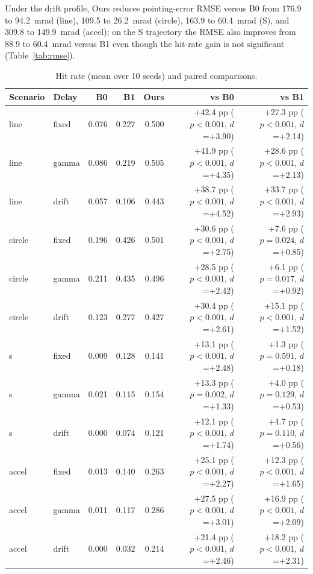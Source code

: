 \documentclass[journal]{IEEEtran}
\begin{document}
Under the drift profile, Ours reduces pointing-error RMSE versus B0 from 176.9 to 94.2~mrad (line), 109.5 to 26.2~mrad (circle), 163.9 to 60.4~mrad (S), and 309.8 to 149.9~mrad (accel); on the S trajectory the RMSE also improves from 88.9 to 60.4~mrad versus B1 even though the hit-rate gain is not significant (Table~\ref{tab:rmse}).

\begin{table}[t]\centering\small

\caption{Hit rate (mean over 10 seeds) and paired comparisons.}

\label{tab:primary}

\begin{tabular}{llrrrrr}

\toprule Scenario & Delay & B0 & B1 & Ours & vs B0 & vs B1\\ \midrule

line & fixed & 0.076 & 0.227 & 0.500 & +42.4 pp ($p<0.001$, $d$=+3.90) & +27.3 pp ($p<0.001$, $d$=+2.14)\\

line & gamma & 0.086 & 0.219 & 0.505 & +41.9 pp ($p<0.001$, $d$=+4.35) & +28.6 pp ($p<0.001$, $d$=+2.13)\\

line & drift & 0.057 & 0.106 & 0.443 & +38.7 pp ($p<0.001$, $d$=+4.52) & +33.7 pp ($p<0.001$, $d$=+2.93)\\

circle & fixed & 0.196 & 0.426 & 0.501 & +30.6 pp ($p<0.001$, $d$=+2.75) & +7.6 pp ($p=0.024$, $d$=+0.85)\\

circle & gamma & 0.211 & 0.435 & 0.496 & +28.5 pp ($p<0.001$, $d$=+2.42) & +6.1 pp ($p=0.017$, $d$=+0.92)\\

circle & drift & 0.123 & 0.277 & 0.427 & +30.4 pp ($p<0.001$, $d$=+2.61) & +15.1 pp ($p<0.001$, $d$=+1.52)\\

s & fixed & 0.009 & 0.128 & 0.141 & +13.1 pp ($p<0.001$, $d$=+2.48) & +1.3 pp ($p=0.591$, $d$=+0.18)\\

s & gamma & 0.021 & 0.115 & 0.154 & +13.3 pp ($p=0.002$, $d$=+1.33) & +4.0 pp ($p=0.129$, $d$=+0.53)\\

s & drift & 0.000 & 0.074 & 0.121 & +12.1 pp ($p<0.001$, $d$=+1.74) & +4.7 pp ($p=0.110$, $d$=+0.56)\\

accel & fixed & 0.013 & 0.140 & 0.263 & +25.1 pp ($p<0.001$, $d$=+2.27) & +12.3 pp ($p<0.001$, $d$=+1.65)\\

accel & gamma & 0.011 & 0.117 & 0.286 & +27.5 pp ($p<0.001$, $d$=+3.01) & +16.9 pp ($p<0.001$, $d$=+2.09)\\

accel & drift & 0.000 & 0.032 & 0.214 & +21.4 pp ($p<0.001$, $d$=+2.46) & +18.2 pp ($p<0.001$, $d$=+2.31)\\

\bottomrule\end{tabular}\end{table}
\end{document}
